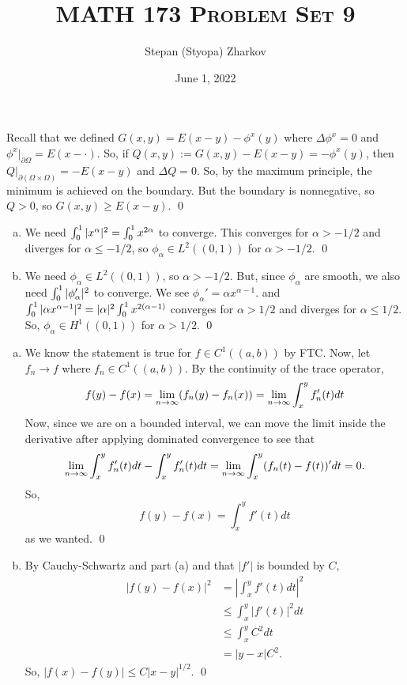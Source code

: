 \documentclass{article}
\title{\textsc{MATH 173 Problem Set 9}}
\author{Stepan (Styopa) Zharkov}
\date{June 1, 2022}
\renewcommand{\d}{\partial}
\begin{document}
\maketitle
{} 
\tri
\hop 
\solution 
Recall that we defined $G(x,y) = E(x-y) - \phi^x(y)$ where $\Delta \phi^x = 0$ and $\phi^x |_{\d
\Omega} = E(x - \cdot)$. So, if $Q(x,y) := G(x,y) - E(x-y) = -\phi^x(y)$, then $Q|_{\d(\Omega \times \Omega)} = -E(x-y)$ and $\Delta Q =0$. So, by the maximum principle, the minimum is achieved on the boundary. But the boundary is nonnegative, so  $Q> 0$, so $G(x,y) \ge E(x-y)$. \qed

\newpage
{} 
\tri
\hop 
\solution
\begin{enumerate}[(a)]
    \item We need $\int_0^1 |x^\alpha|^2 = \int_0^1 x^{2\alpha}$ to converge. This converges for $\alpha > -1/2$ and diverges for $\alpha \le -1/2$, so $\phi_\alpha \in L^2((0,1))$ for $\alpha > -1/2$. \qed
    \item We need $\phi_\alpha \in L^2((0,1))$, so $\alpha > -1/2$. But, since $\phi_\alpha$ are smooth, we also need $\int_0^1 |\phi_\alpha ' |^2$ to converge. We see $\phi_\alpha' = \alpha x^{\alpha-1}$. and $\int_0^1 |\alpha x^{\alpha-1}|^2 = |\alpha|^2\int_0^1 x^{2(\alpha-1)}$ converges for $\alpha > 1/2$ and diverges for $\alpha \le 1/2$. So, $\phi_\alpha \in H^1((0,1))$ for $\alpha > 1/2$. \qed
\end{enumerate}

\newpage
{} 
\tri
\hop 
\solution
\begin{enumerate}[(a)]
    \item We know the statement is true for $f \in C^1((a,b))$ by FTC. Now, let $f_n \to f$ where $f_n \in C^1((a,b))$. By the continuity of the trace operator, 
    \[f(y) - f(x) = {\lim_{n \to \infty}} (f_n(y)-f_n(x)) = {\lim_{n \to \infty}} \int_x^yf_n'(t)dt\]
    Now, since we are on a bounded interval, we can move the limit inside the derivative after applying dominated convergence to see that 
    \[{\lim_{n \to \infty}} \int_x^yf'_n(t)dt - \int_x^yf'_n(t)dt = {\lim_{n \to \infty}} \int_x^y(f_n(t) - f(t))'dt = 0.\]
    So, 
    \[f(y) - f(x) =  \int_x^yf'(t)dt\]
    as we wanted. \qed
    \item By Cauchy-Schwartz and part (a) and that $|f'|$ is bounded by $C$, 
    \begin{align*}
        |f(y) - f(x)|^2 &= |\int_x^y f'(t)dt|^2\\
        &\le \int_x^y|f'(t)|^2 dt \\
        &\le \int_x^yC^2 dt \\
        &= |y-x|C^2.
    \end{align*}
    So, $|f(x) - f(y)| \le C|x-y|^{1/2}$. \qed
\end{enumerate}
\end{document}
